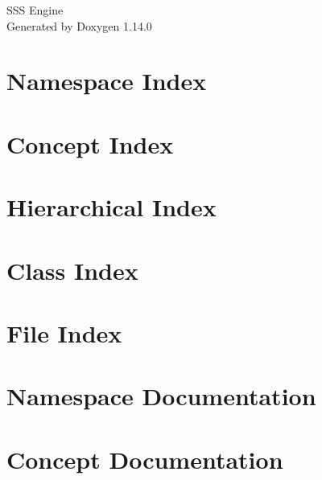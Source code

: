 \documentclass[twoside]{book}
\newcommand{\+}{\discretionary{\mbox{\scriptsize$\hookleftarrow$}}{}{}}
\newcommand{\clearemptydoublepage}{%
    \newpage{\pagestyle{empty}\cleardoublepage}%
  }
\begin{document}
  \raggedbottom
    \hypersetup{pageanchor=false,
                bookmarksnumbered=true,
                pdfencoding=unicode
               }
  \begin{titlepage}
  \vspace*{7cm}
  \begin{center}%
  {\Large SSS Engine}\\
  \vspace*{1cm}
  {\large Generated by Doxygen 1.14.0}\\
  \end{center}
  \end{titlepage}
  \clearemptydoublepage
  \tableofcontents
  \clearemptydoublepage
  \hypersetup{pageanchor=true}
\chapter{Namespace Index}

\chapter{Concept Index}

\chapter{Hierarchical Index}

\chapter{Class Index}

\chapter{File Index}

\chapter{Namespace Documentation}


\chapter{Concept Documentation}







\end{document}
